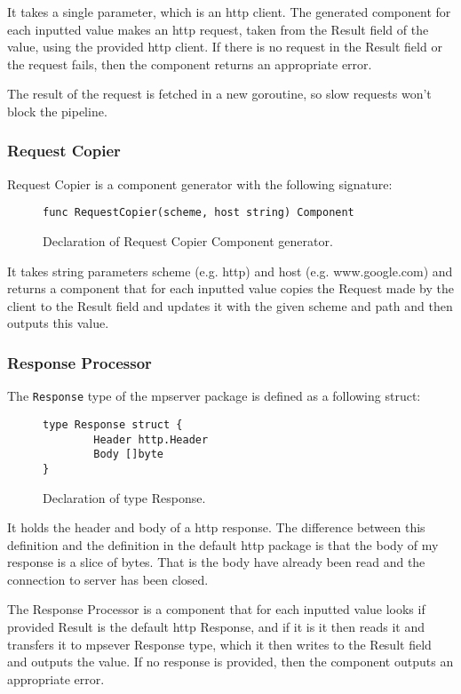 \documentclass[12pt,a4paper]{article}
\begin{document}
It takes a single parameter, which is an http client.
The generated component for each inputted value makes an http request,
taken from the Result field of the value, using the provided http client.
If there is no request in the Result field or the request fails, then
the component returns an appropriate error. 

The result of the request is fetched in a new goroutine, so slow requests
won't block the pipeline.

\subsubsection{Request Copier}
Request Copier is a component generator with the following signature:
\begin{figure}[h]
\centering
\begin{lstlisting}
func RequestCopier(scheme, host string) Component
\end{lstlisting}
\caption[scale=1.0]{Declaration of Request Copier Component generator.}
\label{fig:RequestCopier}
\end{figure}
It takes string parameters scheme (e.g. http) and host (e.g. www.google.com) 
and returns a component that for each inputted value copies the Request made 
by the client to the Result field and updates it with the given scheme and 
path and then outputs this value.

\subsubsection{Response Processor}
The \texttt{Response} type of the mpserver package is defined as a following struct:

\begin{figure}[h]
\centering
\begin{lstlisting}
type Response struct {
		Header http.Header
		Body []byte
}
\end{lstlisting}
\caption[scale=1.0]{Declaration of type Response.}
\label{fig:Response}
\end{figure}

It holds the header and body of a http response. The difference between
this definition and the definition in the default http package is that
the body of my response is a slice of bytes. That is the body have already been
read and the connection to server has been closed.

The Response Processor is a component that for each inputted value
looks if provided Result is the default http Response, and if it is
it then reads it and transfers it to mpsever Response type, which it
then writes to the Result field and outputs the value. If no response
is provided, then the component outputs an appropriate error.
\end{document}
